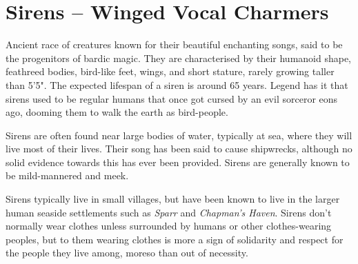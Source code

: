 \section{Sirens -- Winged Vocal Charmers}
Ancient race of creatures known for their beautiful enchanting songs, said to be the progenitors of bardic magic.
They are characterised by their humanoid shape, feathreed bodies, bird-like feet, wings, and short stature, rarely growing taller than 5'5".
The expected lifespan of a siren is around 65 years.
Legend has it that sirens used to be regular humans that once got cursed by an evil sorceror eons ago, dooming them to walk the earth as bird-people.

Sirens are often found near large bodies of water, typically at sea, where they will live most of their lives.
Their song has been said to cause shipwrecks, although no solid evidence towards this has ever been provided.
Sirens are generally known to be mild-mannered and meek.

Sirens typically live in small villages, but have been known to live in the larger human seaside settlements such as \textit{Sparr} and \textit{Chapman's Haven}.
Sirens don't normally wear clothes unless surrounded by humans or other clothes-wearing peoples, but to them wearing clothes is more a sign of solidarity and respect for the people they live among, moreso than out of necessity.